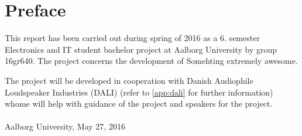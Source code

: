 \chapter*{Preface}\label{ch:forord}%
This report has been carried out during spring of 2016 as a 6. semester Electronics and IT student bachelor project at Aalborg University by group 16gr640. The project concerns the development of Somehting extremely awesome.

The project will be developed in cooperation with Danish Audiophile Loudspeaker Industries (DALI) (refer to \autoref{app:dali} for further information) whome will help with guidance of the project and speakers for the project.   
\\\\

\vspace{0.5\baselineskip}\hfill Aalborg University, May 27, 2016


